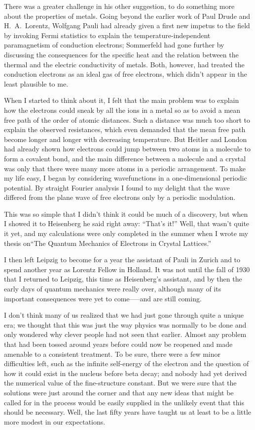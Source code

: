 \documentclass[12pt]{article}
\begin{document}
\smallskip
There was a greater challenge in his other suggestion, to do something more about the properties of metals. Going beyond the earlier work of Paul Drude and H.~A.~Lorentz, Wolfgang Pauli had already given a first new impetus to the field by invoking Fermi statistics to explain the temperature-independent paramagnetism of conduction electrons; Sommerfeld had gone further by discussing the consequences for the specific
heat and the relation between the thermal and the electric conductivity of metals. Both, however, had treated the conduction electrons as an ideal gas of free electrons, which didn't appear in the least plausible to me.

When I started to think about it, I felt that the main problem was to explain how the electrons could sneak by all the ions
in a metal so as to avoid a mean free path of the order of atomic distances. Such a distance was much too short to explain the observed resistances, which even demanded that the mean free path become longer and longer with decreasing temperature. But Heitler and London had already shown how electrons could jump between two atoms in a molecule to form a covalent bond, and the main difference between a molecule and a crystal was only that there were many more atoms in a periodic arrangement. To make my life easy, I began by considering wavefunctions in a one-dimensional periodic potential. By straight Fourier analysis I found to my delight that the wave differed from the plane wave of free electrons only by a periodic modulation.

This was so simple that I didn't think it could be much of a discovery, but when I showed it to Heisenberg he said right away: ``That's it!'' Well, that wasn't quite it yet, and my calculations were only completed in the summer when I wrote my thesis on``The Quantum Mechanics of Electrons in Crystal Lattices.''

I then left Leipzig to become for a year the assistant of Pauli in Zurich and to spend another year as Lorentz Fellow in Holland. It was not until the fall of 1930 that I returned to Leipzig, this time as Heisenberg's assistant, and by then the early days of quantum mechanics were really over, although many of its important consequences were yet to come—--and are still coming.

I don't think many of us realized that we had just gone through quite a unique era; we thought that this was just the way physics was normally to be done and only
wondered why clever people had not seen that earlier. Almost any problem that had been tossed around years before could now be reopened and made amenable to a consistent treatment. To be sure, there were a few minor difficulties left, such as the infinite self-energy of the electron and the question of how it could exist in the nucleus before beta decay; and nobody had yet derived the numerical value of the fine-structure constant. But we were sure that the solutions were just around the corner and that any new ideas that might be called for in the process would be easily supplied in the unlikely event that this should be necessary. Well, the last fifty years have taught us at least to be a little more modest in our expectations.
\end{document}
